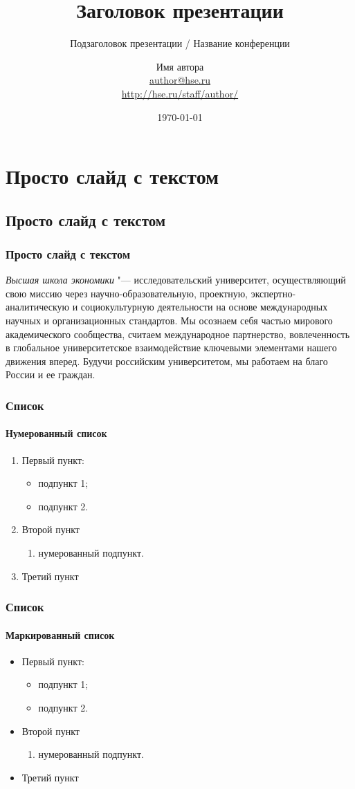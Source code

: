 \documentclass{beamer}
\title[Заголовок]{Заголовок презентации}
\subtitle{Подзаголовок презентации / Название конференции}
\author[Имя автора]{Имя автора \\ \smallskip \scriptsize \url{author@hse.ru}\\\url{http://hse.ru/staff/author/}}
\institute[Высшая школа экономики]{Национальный исследовательский университет \\ «Высшая школа экономики» (Москва)}
\date{\today}
\begin{document}

\frame[plain]{\titlepage}	%

\section{Просто слайд с текстом}
\subsection{Просто слайд с текстом}

\begin{frame}
\frametitle{Просто слайд с текстом}
	\emph{Высшая школа экономики} "--- исследовательский университет, осуществляющий свою миссию через научно-образовательную, проектную, экспертно-аналитическую и социокультурную деятельности на основе международных научных и организационных стандартов. Мы осознаем себя частью мирового академического сообщества, считаем международное партнерство, вовлеченность в глобальное университетское взаимодействие ключевыми элементами нашего движения вперед. Будучи российским университетом, мы работаем на благо России и ее граждан.
\end{frame}

\begin{frame}
\frametitle{Список}
\framesubtitle{Нумерованный список}
	\begin{enumerate} 
		\item Первый пункт:
		\begin{itemize}
			\item подпункт 1;
			\item подпункт 2.
		\end{itemize}
		\item Второй пункт
		\begin{enumerate}
			\item нумерованный подпункт.
		\end{enumerate} 
		\item Третий пункт
	\end{enumerate} 
\end{frame}

\begin{frame}
\frametitle{Список}
\framesubtitle{Маркированный список}
	\begin{itemize}
		\item Первый пункт:
		\begin{itemize}
			\item подпункт 1;
			\item подпункт 2.
		\end{itemize}
		\item Второй пункт
		\begin{enumerate}
			\item нумерованный подпункт.
		\end{enumerate}
		\item Третий пункт
	\end{itemize}
\end{frame}
\end{document}
